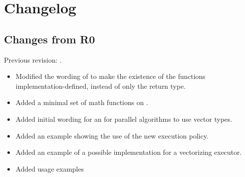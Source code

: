 \section{Changelog}
\subsection{Changes from R0}
Previous revision: \citep{P0214R0}.
\begin{itemize}
  \chck Extended the  tag types with a  tag to handle arbitrarily sized vectors (\ref{sec:datapar.abi}).
  \chck Converted  into a non-member trait (\ref{sec:datapar.traits}).
  \chck Extended implicit conversions to handle \fixedsizeN (\ref{sec:datapar.ctor}).
  \chck Extended binary operators to convert correctly with \fixedsizeN (\ref{sec:datapar.binary}).
  \chck Dropped the section on “\datapar logical operators”. Added a note that the omission is deliberate (\ref{sec:datapar.logical}).
  \chck Added logical and bitwise operators to \mask (\ref{sec:mask.binary}).
  \chck Modified \mask compares to work better with implicit conversions (\ref{sec:mask.comparison}).
  \chck Modified  to support different Abi tags on the \mask and \datapar arguments (\ref{sec:mask.where}).
  \chck Converted the load functions to non-member functions.
    SG1 asked for guidance from LEWG whether a load-expression or a template parameter to load is more appropriate.
  \chck Converted the store functions to non-member functions to be consistent with the load functions.
  \chck Added a note about masked stores not invoking out-of-bounds accesses for masked-off elements of the vector.
  \chck Converted the return type of \datapar{} to return a smart reference instead of an lvalue reference.
  \chck Modified the wording of \mask{} to match the reference type returned from \datapar{}.
  \item Modified the wording of  to make the existence of the functions implementation-defined, instead of only the return type.
  \item Added a minimal set of math functions on \datapar.
  \item Added initial wording for an  for parallel algorithms to use vector types.
  \item Added an example showing the use of the new execution policy.
  \item Added an example of a possible  implementation for a vectorizing executor.
  \item Added usage examples
\end{itemize}





